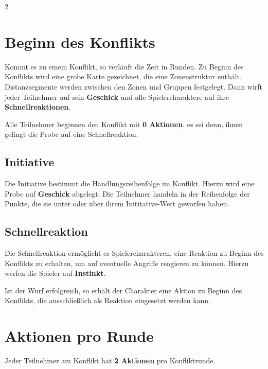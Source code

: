 \label{ch:konflikte}

\begin{multicols*}{2}

\section{Beginn des Konflikts}\label{sec:konflikt-beginn}

Kommt es zu einem Konflikt, so verläuft die Zeit in Runden.
Zu Beginn des Konflikts wird eine grobe Karte gezeichnet, die eine Zonenstruktur enthält.
Distanzsegmente werden zwischen den Zonen und Gruppen festgelegt.
Dann wirft jeder Teilnehmer auf sein \textbf{Geschick} und alle Spielercharaktere auf ihre \textbf{Schnellreaktionen}.

Alle Teilnehmer beginnen den Konflikt mit \textbf{0 Aktionen}, es sei denn, ihnen gelingt die Probe auf eine Schnellreaktion.

\subsection{Initiative}\label{subsec:initiative}

Die Initiative bestimmt die Handlungsreihenfolge im Konflikt.
Hierzu wird eine Probe auf \textbf{Geschick} abgelegt.
Die Teilnehmer handeln in der Reihenfolge der Punkte, die sie unter oder über ihrem Inititative-Wert geworfen haben.

\subsection{Schnellreaktion}\label{subsec:schnellreaktion}

Die Schnellreaktion ermöglicht es Spielercharakteren, eine Reaktion zu Beginn des Konflikts zu erhalten, um auf eventuelle Angriffe reagieren zu können.
Hierzu werfen die Spieler auf \textbf{Instinkt}.

Ist der Wurf erfolgreich, so erhält der Charakter eine Aktion zu Beginn des Konflikts, die ausschließlich als Reaktion eingesetzt werden kann.

\section{Aktionen pro Runde}\label{sec:aktionen-pro-runde}

Jeder Teilnehmer am Konflikt hat \textbf{2 Aktionen} pro Konfliktrunde.


\end{multicols*}
